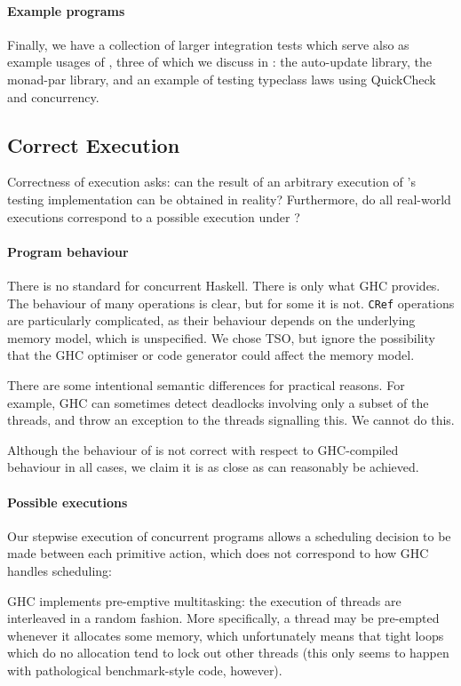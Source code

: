 \paragraph{Example programs}
Finally, we have a collection of larger integration tests which serve
also as example usages of \dejafu{}, three of which we discuss in
: the auto-update
library\cite{auto_update}, the monad-par
library\cite{monad_par,marlow2011}, and an example of testing
typeclass laws using QuickCheck\cite{claessen2000} and concurrency.

\subsection{Correct Execution}

Correctness of execution asks: can the result of an arbitrary
execution of \dejafu{}'s testing implementation can be obtained in
reality?  Furthermore, do all real-world executions correspond to a
possible execution under \dejafu{}?

\paragraph{Program behaviour}
There is no standard for concurrent Haskell.  There is only what GHC
provides.  The behaviour of many operations is clear, but for some it
is not.  \verb|CRef| operations are particularly complicated, as their
behaviour depends on the underlying memory model, which is
unspecified.  We chose TSO, but ignore the possibility that the GHC
optimiser or code generator could affect the memory model.

There are some intentional semantic differences for practical reasons.
For example, GHC can sometimes detect deadlocks involving only a
subset of the threads, and throw an exception to the threads
signalling this.  We cannot do this.

Although the behaviour of \dejafu{} is not correct with respect to
GHC-compiled behaviour in all cases, we claim it is as close as can
reasonably be achieved.

\paragraph{Possible executions}
Our stepwise execution of concurrent programs allows a scheduling
decision to be made between each primitive action, which does not
correspond to how GHC handles scheduling:

\begin{displayquote}
  GHC implements pre-emptive multitasking: the execution of threads
  are interleaved in a random fashion.  More specifically, a thread may
  be pre-empted whenever it allocates some memory, which unfortunately
  means that tight loops which do no allocation tend to lock out other
  threads (this only seems to happen with pathological benchmark-style
  code, however).\cite{control_concurrent}
\end{displayquote}

